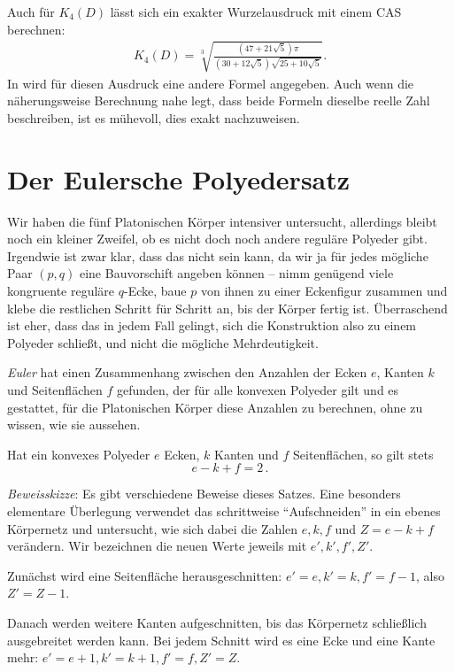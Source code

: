 \documentclass[11pt]{article}
\begin{document}
Auch für $K_4(D)$ lässt sich ein exakter Wurzelausdruck mit einem CAS berechnen:
\begin{gather*}
  K_4(D)=\sqrt[3]{\frac{(47+21\sqrt{5})\pi}{(30+12\sqrt{5})\sqrt{25+10\sqrt{5}}}}. 
\end{gather*}
In \cite{Sphaer} wird für diesen Ausdruck eine andere Formel angegeben.  Auch
wenn die näherungsweise Berechnung nahe legt, dass beide Formeln dieselbe
reelle Zahl beschreiben, ist es mühevoll, dies exakt nachzuweisen.

\section*{Der Eulersche Polyedersatz}

Wir haben die fünf Platonischen Körper intensiver untersucht, allerdings
bleibt noch ein kleiner Zweifel, ob es nicht doch noch andere reguläre
Polyeder gibt.  Irgendwie ist zwar klar, dass das nicht sein kann, da wir ja
für jedes mögliche Paar $(p,q)$ eine Bauvorschift angeben können -- nimm
genügend viele kongruente reguläre $q$-Ecke, baue $p$ von ihnen zu einer
Eckenfigur zusammen und klebe die restlichen Schritt für Schritt an, bis der
Körper fertig ist.  Überraschend ist eher, dass das in jedem Fall gelingt,
sich die Konstruktion also zu einem Polyeder schließt, und nicht die mögliche
Mehrdeutigkeit. 

\emph{Euler} hat einen Zusammenhang zwischen den Anzahlen der Ecken $e$,
Kanten $k$ und Seitenflächen $f$ gefunden, der für alle konvexen Polyeder gilt
und es gestattet, für die Platonischen Körper diese Anzahlen zu berechnen,
ohne zu wissen, wie sie aussehen.

\begin{satz}
Hat ein konvexes Polyeder $e$ Ecken, $k$ Kanten und $f$ Seitenflächen,
so gilt stets \[e-k+f=2\,.\]
\end{satz}

\emph{Beweisskizze}: Es gibt verschiedene Beweise dieses Satzes. Eine
besonders elementare Über\-legung verwendet das schrittweise
``Aufschneiden'' in ein ebenes Körpernetz und untersucht, wie sich
dabei die Zahlen $e,k,f$ und $Z=e-k+f$ verändern. Wir bezeichnen die
neuen Werte jeweils mit $e',k',f',Z'$.

Zunächst wird eine Seitenfläche herausgeschnitten: $e'=e, k'=k,
f'=f-1$, also $Z'=Z-1$.

Danach werden weitere Kanten aufgeschnitten, bis das Körpernetz
schließlich ausgebreitet werden kann. Bei jedem Schnitt wird es eine
Ecke und eine Kante mehr: $e'=e+1, k'=k+1, f'=f, Z'=Z$.
\end{document}
